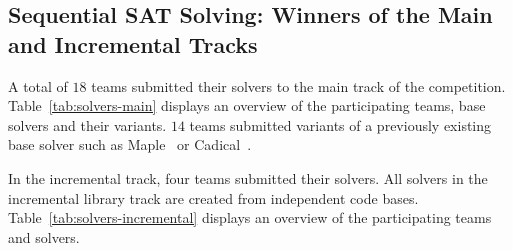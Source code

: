 \documentclass{elsarticle}
\begin{document}
\subsection{Sequential SAT Solving: Winners of the Main and Incremental Tracks}
\label{sec:part:seq}

A total of $18$ teams submitted their solvers to the main track of the competition.  
Table~\ref{tab:solvers-main} displays an overview of the participating teams, base solvers and their variants. 
$14$ teams submitted variants of a previously existing base solver such as Maple~\cite{} or Cadical~\cite{}. 

In the incremental track, four teams submitted their solvers. 
All solvers in the incremental library track are created from independent code bases. 
Table~\ref{tab:solvers-incremental} displays an overview of the participating teams and solvers. 
\end{document}
